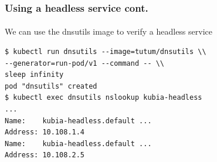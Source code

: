 
\begin{frame}[fragile]
	\frametitle{Using a headless service cont.}
	\framesubtitle{}
	We can use the dnsutils image to verify a headless service
	\begin{lstlisting}[numbers=none, basicstyle=\ttfamily]
$ kubectl run dnsutils --image=tutum/dnsutils \\
--generator=run-pod/v1 --command -- \\
sleep infinity
pod "dnsutils" created
$ kubectl exec dnsutils nslookup kubia-headless
...
Name:    kubia-headless.default ...
Address: 10.108.1.4
Name:    kubia-headless.default ...
Address: 10.108.2.5
	\end{lstlisting}
\end{frame}

